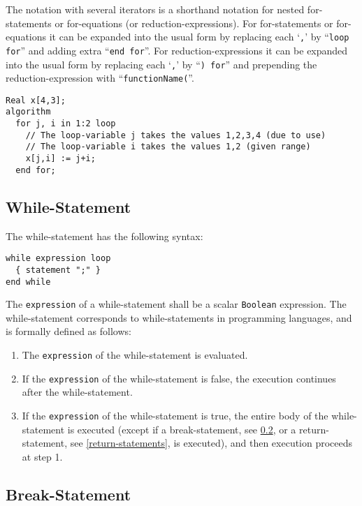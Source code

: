 The notation with several iterators is a shorthand notation for nested
for-statements or for-equations (or reduction-expressions). For
for-statements or for-equations it can be expanded into the usual form
by replacing each `\lstinline!,!' by ``\lstinline!loop for!'' and adding extra ``\lstinline!end for!''. For
reduction-expressions it can be expanded into the usual form by
replacing each `\lstinline!,!' by ``\lstinline!) for!'' and prepending the reduction-expression
with ``\lstinline!functionName(!''.

\begin{example}
\begin{lstlisting}[language=modelica]
  Real x[4,3];
algorithm
  for j, i in 1:2 loop
    // The loop-variable j takes the values 1,2,3,4 (due to use)
    // The loop-variable i takes the values 1,2 (given range)
    x[j,i] := j+i;
  end for;
\end{lstlisting}
\end{example}

\subsection{While-Statement}\label{while-statement}

The while-statement has the following syntax:
\begin{lstlisting}[language=grammar]
while expression loop
  { statement ";" }
end while
\end{lstlisting}
The \lstinline!expression! of a while-statement shall be a scalar \lstinline!Boolean! expression.  The while-statement corresponds to while-statements in programming languages, and is formally defined as follows:
\begin{enumerate}
\item The \lstinline!expression! of the while-statement is evaluated.
\item If the \lstinline!expression! of the while-statement is false, the execution
continues after the while-statement.
\item If the \lstinline!expression! of the while-statement is true, the entire body of
the while-statement is executed (except if a break-statement, see
\cref{break-statement}, or a return-statement, see \cref{return-statements}, is executed),
and then execution proceeds at step 1.
\end{enumerate}

\subsection{Break-Statement}\label{break-statement}

